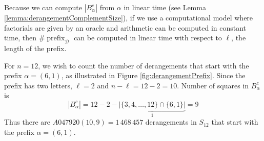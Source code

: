 Because we can compute $|B_\alpha^c|$ from $\alpha$ in linear time
(see Lemma \ref{lemma:derangementComplementSize}), if we use a computational
model where factorials are given by an oracle and arithmetic can be computed
in constant time, then $\#\operatorname{prefix}_\mathcal{D}$ can be computed
in linear time with respect to $\ell$, the length of the prefix.

\begin{example}
  For $n = 12$, we wish to count the number of derangements that
  start with the prefix $\alpha = (6,1)$, as illustrated in Figure
  \ref{fig:derangementPrefix}.
  Since the prefix has two letters, $\ell = 2$ and $n - \ell = 12 - 2 = 10$.
  Number of squares in $B_\alpha^c$ is \begin{equation}
    |B_\alpha^c| = 12 - 2 - \underbrace{|\{3,4,\dots,12\} \cap \{6, 1\}|}_1 = 9
  \end{equation}
  Thus there are $A047920(10,9) = 1\,468\,457$ derangements in $S_{12}$
  that start with the prefix $\alpha = (6,1)$.
\end{example}

